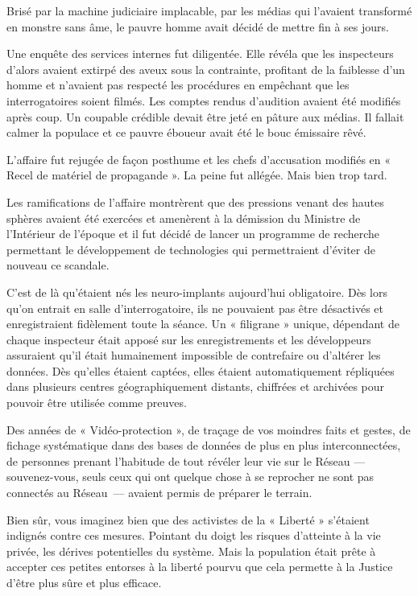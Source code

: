 Brisé par la machine judiciaire implacable, par les médias qui l'avaient
transformé en monstre sans âme, le pauvre homme avait décidé de mettre fin à
ses jours.

Une enquête des services internes fut diligentée. Elle révéla que les
inspecteurs d'alors avaient extirpé des aveux sous la contrainte, profitant de
la faiblesse d'un homme et n'avaient pas respecté les procédures en empêchant
que les interrogatoires soient filmés. Les comptes rendus d'audition avaient été
modifiés après coup. Un coupable crédible devait être jeté en pâture aux médias.
Il fallait calmer la populace et ce pauvre éboueur avait été le bouc émissaire
rêvé. 

L'affaire fut rejugée de façon posthume et les chefs d'accusation modifiés en
« Recel de matériel de propagande ». La peine fut allégée. Mais bien trop tard.

Les ramifications de l'affaire montrèrent que des pressions venant des hautes
sphères avaient été exercées et amenèrent à la démission du Ministre de
l'Intérieur de l'époque et il fut décidé de lancer un programme de recherche
permettant le développement de technologies qui permettraient d'éviter de
nouveau ce scandale.

C'est de là qu'étaient nés les neuro-implants aujourd'hui obligatoire. Dès lors
qu'on entrait en salle d'interrogatoire, ils ne pouvaient pas être désactivés et
enregistraient fidèlement toute la séance. Un « filigrane » unique, dépendant
de chaque inspecteur était apposé sur les enregistrements et les développeurs
assuraient qu'il était humainement impossible de contrefaire ou d'altérer les
données. Dès qu'elles étaient captées, elles étaient automatiquement répliquées
dans plusieurs centres géographiquement distants, chiffrées et archivées pour
pouvoir être utilisée comme preuves.

Des années de « Vidéo-protection », de traçage de vos moindres faits et gestes,
de fichage systématique dans des bases de données de plus en plus
interconnectées, de personnes prenant l'habitude de tout révéler leur vie sur le
Réseau — souvenez-vous, seuls ceux qui ont quelque chose à se reprocher ne sont
pas connectés au Réseau — avaient permis de préparer le terrain.

Bien sûr, vous imaginez bien que des activistes de la « Liberté » s'étaient
indignés contre ces mesures. Pointant du doigt les risques d'atteinte à la vie
privée, les dérives potentielles du système. Mais la population était prête à
accepter ces petites entorses à la liberté pourvu que cela permette à la
Justice d'être plus sûre et plus efficace.

